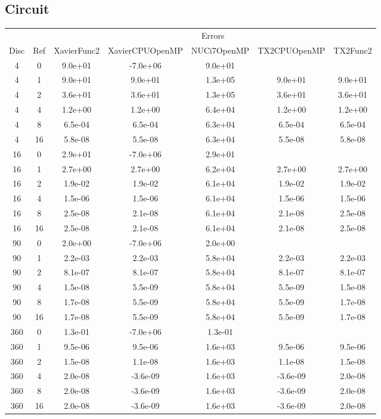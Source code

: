\subsection{Circuit}
\begin{center}
\begin{tabular}{c|c|c|c|c|c|c}
	&&\multicolumn{5}{c}{Errors}\\
	Disc&Ref&XavierFunc2&XavierCPUOpenMP&NUCi7OpenMP&TX2CPUOpenMP&TX2Func2\\
\hline
4&0&9.0e+01&-7.0e+06&9.0e+01\\
4&1&9.0e+01&9.0e+01&1.3e+05&9.0e+01&9.0e+01\\
4&2&3.6e+01&3.6e+01&1.3e+05&3.6e+01&3.6e+01\\
4&4&1.2e+00&1.2e+00&6.4e+04&1.2e+00&1.2e+00\\
4&8&6.5e-04&6.5e-04&6.3e+04&6.5e-04&6.5e-04\\
4&16&5.8e-08&5.5e-08&6.3e+04&5.5e-08&5.8e-08\\
\hline
16&0&2.9e+01&-7.0e+06&2.9e+01\\
16&1&2.7e+00&2.7e+00&6.2e+04&2.7e+00&2.7e+00\\
16&2&1.9e-02&1.9e-02&6.1e+04&1.9e-02&1.9e-02\\
16&4&1.5e-06&1.5e-06&6.1e+04&1.5e-06&1.5e-06\\
16&8&2.5e-08&2.1e-08&6.1e+04&2.1e-08&2.5e-08\\
16&16&2.5e-08&2.1e-08&6.1e+04&2.1e-08&2.5e-08\\
\hline
90&0&2.0e+00&-7.0e+06&2.0e+00\\
90&1&2.2e-03&2.2e-03&5.8e+04&2.2e-03&2.2e-03\\
90&2&8.1e-07&8.1e-07&5.8e+04&8.1e-07&8.1e-07\\
90&4&1.5e-08&5.5e-09&5.8e+04&5.5e-09&1.5e-08\\
90&8&1.7e-08&5.5e-09&5.8e+04&5.5e-09&1.7e-08\\
90&16&1.7e-08&5.5e-09&5.8e+04&5.5e-09&1.7e-08\\
\hline
360&0&1.3e-01&-7.0e+06&1.3e-01\\
360&1&9.5e-06&9.5e-06&1.6e+03&9.5e-06&9.5e-06\\
360&2&1.5e-08&1.1e-08&1.6e+03&1.1e-08&1.5e-08\\
360&4&2.0e-08&-3.6e-09&1.6e+03&-3.6e-09&2.0e-08\\
360&8&2.0e-08&-3.6e-09&1.6e+03&-3.6e-09&2.0e-08\\
360&16&2.0e-08&-3.6e-09&1.6e+03&-3.6e-09&2.0e-08\\
\hline
\end{tabular}
\end{center}



